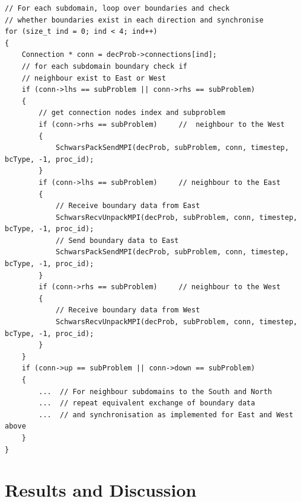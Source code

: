 \documentclass[acmsmall,review,anonymous]{acmart}\settopmatter{printfolios=true,printccs=false,printacmref=false}
\begin{document}
\begin{lstlisting}[caption= Sample MPI implementation of boundary exchange and synchronization within a DD problem
, label=boundMPI]
// For each subdomain, loop over boundaries and check
// whether boundaries exist in each direction and synchronise
for (size_t ind = 0; ind < 4; ind++)  
{   
    Connection * conn = decProb->connections[ind];  
    // for each subdomain boundary check if 
    // neighbour exist to East or West  
    if (conn->lhs == subProblem || conn->rhs == subProblem)  
    {
        // get connection nodes index and subproblem
        if (conn->rhs == subProblem)     //  neighbour to the West
        {
            SchwarsPackSendMPI(decProb, subProblem, conn, timestep, bcType, -1, proc_id);
        }
        if (conn->lhs == subProblem)     // neighbour to the East 
        {
            // Receive boundary data from East 
            SchwarsRecvUnpackMPI(decProb, subProblem, conn, timestep, bcType, -1, proc_id);
            // Send boundary data to East
            SchwarsPackSendMPI(decProb, subProblem, conn, timestep, bcType, -1, proc_id);
        }
        if (conn->rhs == subProblem)     // neighbour to the West
        {
            // Receive boundary data from West 
            SchwarsRecvUnpackMPI(decProb, subProblem, conn, timestep, bcType, -1, proc_id);
        }
    } 
    if (conn->up == subProblem || conn->down == subProblem)  
    {
        ...  // For neighbour subdomains to the South and North
        ...  // repeat equivalent exchange of boundary data 
        ...  // and synchronisation as implemented for East and West above
    }     
}
\end{lstlisting}

\section{Results and Discussion}
\end{document}
